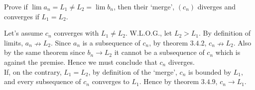 \documentclass[boxes, qed]{homework}
\begin{document}
\newenvironment{amatrix}[1]{%
  \left[\begin{array}{@{}*{#1}{c}|c@{}}
}{%
  \end{array}\right]
}

\newenvironment{augmatrix}[1]{%
  \left[\begin{array}{#1}
}{%
  \end{array}\right]
}

\begin{problem}Prove if $\lim{a_n} = L_1 \neq L_2 = \lim{b_n}$, 
  then their `merge', $(c_n)$ diverges and converges if $L_1=L_2$.
\end{problem}
\begin{solution}Let's assume $c_n$ converges with 
  $L_1 \neq L_2$. W.L.O.G., let $L_2>L_1$. 
  By definition of limits, $a_n \nrightarrow L_2$.
  Since $a_n$ is a subsequence of $c_n$, by theorem $3.4.2$,
  $c_n \nrightarrow L_2$. Also by the same theorem since $b_n \rightarrow L_2$
  it cannot be a subsequence of $c_n$ which is against the premise. 
  Hence we must conclude that $c_n$ diverges.\\
  If, on the contrary, $L_1=L_2$, by definition of the `merge', 
  $c_n$ is bounded by $L_1$, and every subsequence of $c_n$ converges to $L_1$.
  Hence by theorem $3.4.9$, $c_n \rightarrow L_1$.
\end{solution}
\end{document}
